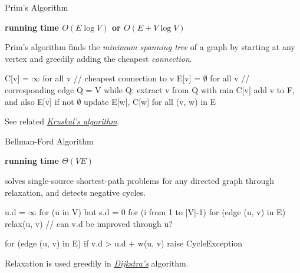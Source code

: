 \documentclass{cognito}
\begin{document}
\begin{note}{Prim's Algorithm}
	\begin{mdframed}[linecolor=black!25!white]
		\bf running time $O(E \log V)$ or $O(E + V \log V)$
	\end{mdframed}
	Prim's algorithm finds the {\it minimum spanning tree} of a graph by starting at any vertex and greedily adding
	the cheapest {\it connection}.
	\begin{largecode}
 C[v] = $\infty$ for all v  // cheapest connection to v
 E[v] = $\emptyset$ for all v   // corresponding edge
 Q = V
 while Q:
 	extract v from Q with min C[v]
	add v to F, and also E[v] if not $\emptyset$
	update E[w], C[w] for all (v, w) in E
	\end{largecode}
	\begin{remark} See related \hyperref[note:Kruskal's Algorithm]{\it Kruskal's algorithm}.\end{remark}\vspace{-5pt}
\end{note}

\begin{note}{Bellman-Ford Algorithm}
	\begin{mdframed}[linecolor=black!25!white]
		\bf running time $\Theta(V E)$
	\end{mdframed}
	 solves single-source shortest-path problems for any directed graph through relaxation, and detects negative cycles.
	\begin{largecode}
 u.d = $\infty$ for (u in V) but s.d = 0
 for (i from 1 to |V|-1)
	for (edge (u, v) in E)
		relax(u, v)  // can v.d be improved through u?

 for (edge (u, v) in E)
	if v.d > u.d + w(u, v) raise CycleException
	\end{largecode}
	\begin{remark} Relaxation is used greedily in \hyperref[note:Dijkstra's Algorithm]{\it Dijkstra's} algorithm.\end{remark}
	\vspace{-5pt}
\end{note}
\end{document}
